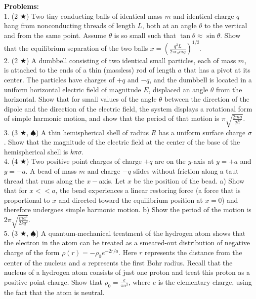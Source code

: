 \noindent \textbf{Problems:}\\
1. (2 $\bigstar$) Two tiny conducting balls of identical mass $m$ and identical charge $q$ hang from nonconducting threads of length $L$, both at an angle $\theta$ to the vertical and from the same point. Assume $\theta$ is so small such that $\tan \theta \approx \sin \theta$. Show that the equilibrium separation of the two balls $x = \left( \frac{q^2L}{2\pi\epsilon_0 mg}\right)^{1/3}$.\\
2. (2 $\bigstar$) A dumbbell consisting of two identical small particles, each of mass $m$, is attached to the ends of a thin (massless) rod of length $a$ that has a pivot at its center. The particles have charges of $+q$ and $-q$, and the dumbbell is located in a uniform horizontal electric field of magnitude $E$, displaced an angle $\theta$ from the horizontal. Show that for small values of the angle $\theta$ between the direction of the dipole and the direction of the electric field, the system displays a rotational form of simple harmonic motion, and show that the period of that motion is $\pi \sqrt{\frac{2ma}{qE}}$. \\
3. (3 $\bigstar$, $\spadesuit$) A thin hemispherical shell of radius $R$ has a uniform surface charge $\sigma$. Show that the magnitude of the electric field at the center of the base of the hemispherical shell is $k\pi\sigma$.\\
4. (4 $\bigstar$) Two positive point charges of charge $+q$ are on the $y$-axis at $y=+a$ and $y=-a$. A bead of mass $m$ and charge $-q$ slides without friction along a taut thread that runs along the $x-$axis. Let $x$ be the position of the bead. a) Show that for $x<<a$, the bead experiences a linear restoring force (a force that is proportional to $x$ and directed toward the equilibrium position at $x=0$) and therefore undergoes simple harmonic motion. b) Show the period of the motion is $2\pi \sqrt{\frac{ma^3}{2kq^2}}$.\\
5. (3 $\bigstar$, $\spadesuit$) A quantum-mechanical treatment of the hydrogen atom shows that the electron in the atom can be treated as a smeared-out distribution of negative charge of the form $\rho(r) = -\rho_0e^{-2r/a}$. Here $r$ represents the distance from the center of the nucleus and $a$ represents the first Bohr radius. Recall that the nucleus of a hydrogen atom consists of just one proton and treat this proton as a positive point charge. Show that $\rho_0 = \frac{e}{\pi a^3}$, where $e$ is the elementary charge, using the fact that the atom is neutral. \\
